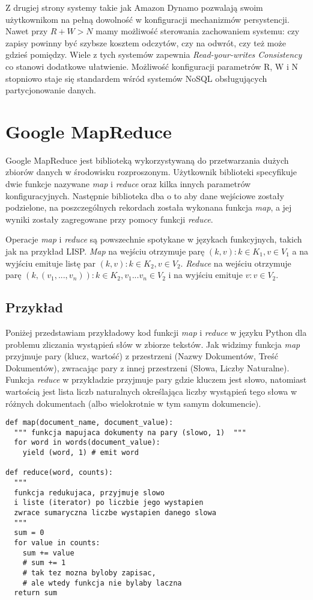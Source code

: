 Z drugiej strony systemy takie jak Amazon Dynamo pozwalają swoim użytkownikom na pełną dowolność w konfiguracji mechanizmów persystencji.
Nawet przy $R+W>N$ mamy możliwość sterowania zachowaniem systemu: czy zapisy powinny być szybsze kosztem odczytów, czy na odwrót, czy też może gdzieś pomiędzy.
Wiele z tych systemów zapewnia \emph{Read-your-writes Consistency} co stanowi dodatkowe ułatwienie.
Możliwość konfiguracji parametrów R, W i N stopniowo staje się standardem wśród systemów NoSQL obsługujących partycjonowanie danych.

\section{Google MapReduce}

Google MapReduce \cite{google-mapreduce} jest biblioteką wykorzystywaną do przetwarzania dużych zbiorów danych w środowisku rozproszonym.
Użytkownik biblioteki specyfikuje dwie funkcje nazywane \emph{map} i \emph{reduce} oraz kilka innych parametrów konfiguracyjnych.
Następnie biblioteka dba o to aby dane wejściowe zostały podzielone, na poszczególnych rekordach została wykonana funkcja \emph{map}, a jej wyniki zostały zagregowane przy pomocy funkcji \emph{reduce}.

Operacje \emph{map} i \emph{reduce} są powszechnie spotykane w językach funkcyjnych, takich jak na przykład LISP.
\emph{Map} na wejściu otrzymuje parę $(k, v): k \in K_1, v \in V_1$ a na wyjściu emituje listę par $(k, v): k \in K_2, v \in V_2$.
\emph{Reduce} na wejściu otrzymuje parę $(k, (v_1, ..., v_n)): k \in K_2, v_1...v_n \in V_2$ i na wyjściu emituje $v: v \in V_2$.

\subsection*{Przykład}

Poniżej przedstawiam przykładowy kod funkcji \emph{map} i \emph{reduce} w języku Python dla problemu zliczania wystąpień słów w zbiorze tekstów. 
Jak widzimy funkcja \emph{map} przyjmuje pary (klucz, wartość) z przestrzeni (Nazwy Dokumentów, Treść Dokumentów), zwracając pary z innej przestrzeni (Słowa, Liczby Naturalne).
Funkcja \emph{reduce} w przykładzie przyjmuje pary gdzie kluczem jest słowo, natomiast wartością jest lista liczb naturalnych określająca liczby wystąpień tego słowa w różnych dokumentach (albo wielokrotnie w tym samym dokumencie).

\begin{verbatim}
def map(document_name, document_value):
  """ funkcja mapujaca dokumenty na pary (slowo, 1)  """
  for word in words(document_value):
    yield (word, 1) # emit word

def reduce(word, counts):
  """ 
  funkcja redukujaca, przyjmuje slowo 
  i liste (iterator) po liczbie jego wystapien
  zwrace sumaryczna liczbe wystapien danego slowa
  """
  sum = 0
  for value in counts:
    sum += value
    # sum += 1
    # tak tez mozna byloby zapisac, 
    # ale wtedy funkcja nie bylaby laczna     
  return sum 
\end{verbatim}


